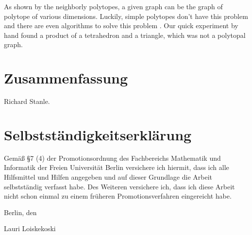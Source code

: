 \documentclass[a4paper,12pt]{book}
\theoremstyle{plain}
\theoremstyle{definition}
\begin{document}
 As shown by the neighborly polytopes, a given graph can be the graph of polytope of various dimensions. 
Luckily, simple polytopes don't have this problem and there are even algorithms to solve this problem \cite{KALAI1988381} \cite{Achatz2000}. 
Our quick experiment by hand found a product of a tetrahedron and a triangle, which was not a polytopal graph.




\cleardoublepage
{}
{}






\chapter*{Zusammenfassung}

\small{
Richard Stanle.}




\chapter*{Selbstst\"andigkeitserkl\"arung}

Gem\"a{\ss} \S 7 (4) der Promotionsordnung des Fachbereichs Mathematik und Informatik der Freien Universit\"at Berlin versichere ich hiermit, dass ich alle Hilfsmittel und Hilfen angegeben und auf dieser Grundlage die Arbeit selbstst\"andig verfasst habe. Des Weiteren versichere ich, dass ich diese Arbeit nicht schon einmal zu einem fr\"uheren Promotionsverfahren eingereicht habe.

\vspace{0.8cm}
\noindent Berlin, den 

\vspace{1.6cm}
\noindent Lauri Loiskekoski
\end{document}
